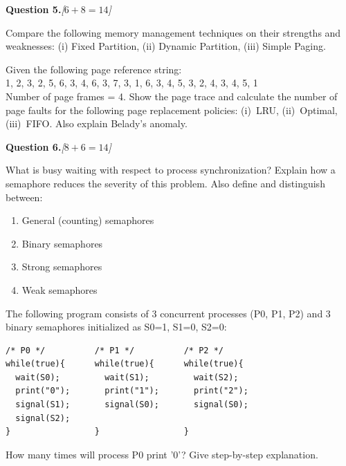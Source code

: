 \documentclass[11pt,a4paper]{article}
\newcommand{\pts}[1]{\hfill   \textit{[#1]}}
\begin{document}
\bigskip




\noindent   \textbf{Question 5.}\pts{$6+8=14$}

\begin{parts}
  \item Compare the following memory management techniques on their strengths and weaknesses: (i) Fixed Partition, (ii) Dynamic Partition, (iii) Simple Paging.
  \item Given the following page reference string:\\
  1, 2, 3, 2, 5, 6, 3, 4, 6, 3, 7, 3, 1, 6, 3, 4, 5, 3, 2, 4, 3, 4, 5, 1\\
  Number of page frames = 4. Show the page trace and calculate the number of page faults for the following page replacement policies: (i)~LRU, (ii)~Optimal, (iii)~FIFO. Also explain Belady's anomaly.
\end{parts}

\bigskip




\noindent   \textbf{Question 6.}\pts{$8+6=14$}

\begin{parts}
  \item What is busy waiting with respect to process synchronization? Explain how a semaphore reduces the severity of this problem. Also define and distinguish between:
    
\begin{enumerate}[label=(\roman*)]
      \item General (counting) semaphores
      \item Binary semaphores
      \item Strong semaphores
      \item Weak semaphores
    \end{enumerate}
  \item The following program consists of 3 concurrent processes (P0, P1, P2) and 3 binary semaphores initialized as S0=1, S1=0, S2=0:

\begin{lstlisting}[numbers=none]
/* P0 */          /* P1 */          /* P2 */
while(true){      while(true){      while(true){
  wait(S0);         wait(S1);         wait(S2);
  print("0");       print("1");       print("2");
  signal(S1);       signal(S0);       signal(S0);
  signal(S2);
}                 }                 }
\end{lstlisting}
  How many times will process P0 print '0'? Give step-by-step explanation.
\end{parts}
\end{document}

